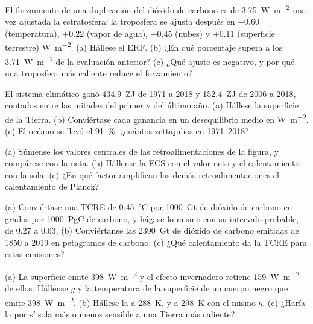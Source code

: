 \begin{exercise}[$\star$]\label{exo:b2:anthropogenic-climate-change:1}
El forzamiento de una duplicación del dióxido de carbono es de \qty{3.75}{W.m^{-2}} una vez ajustada la estratosfera;
la troposfera se ajusta después en $-0.60$ (temperatura), +0.22 (vapor de agua), +0.45 (nubes) y
+0.11 (superficie terrestre) \unit{W.m^{-2}}. (a) Hállese el ERF. (b) ¿En qué porcentaje supera a los
\qty{3.71}{W.m^{-2}} de la evaluación anterior? (c) ¿Qué ajuste es negativo, y por qué una troposfera más caliente
reduce el forzamiento?
\end{exercise}

\begin{exercise}[$\star$]\label{exo:b2:anthropogenic-climate-change:2}
El sistema climático ganó \qty{434.9}{ZJ} de 1971 a 2018 y \qty{152.4}{ZJ} de 2006 a 2018,
contados entre las mitades del primer y del último año. (a) Hállese la superficie de la Tierra.
(b) Conviértase cada ganancia en un desequilibrio medio en \unit{W.m^{-2}}. (c) El océano se llevó el
\qty{91}{\percent}: ¿cuántos zettajulios en 1971--2018?
\end{exercise}

\begin{exercise}[$\star$]\label{exo:b2:anthropogenic-climate-change:3}
(a) Súmense los valores centrales de las retroalimentaciones de la figura, y compárese con la neta. (b) Hállense
la ECS con el valor neto y el calentamiento con la  sola. (c) ¿En qué factor amplifican
las demás retroalimentaciones el calentamiento de Planck?
\end{exercise}

\begin{exercise}[$\star$]\label{exo:b2:anthropogenic-climate-change:4}
(a) Conviértase una TCRE de \qty{0.45}{\celsius} por \qty{1000}{Gt} de dióxido de carbono en grados por
\qty{1000}{PgC} de carbono, y hágase lo mismo con su intervalo probable, de 0.27 a 0.63. (b) Conviértanse las
\qty{2390}{Gt} de dióxido de carbono emitidas de 1850 a 2019 en petagramos de carbono. (c) ¿Qué
calentamiento da la TCRE para estas emisiones?
\end{exercise}

\begin{exercise}[$\star\star$]\label{exo:b2:anthropogenic-climate-change:5}
(a) La superficie emite \qty{398}{W.m^{-2}} y el efecto invernadero retiene \qty{159}{W.m^{-2}} de
ellos. Hállense $g$ y la temperatura de la superficie de un cuerpo negro que emite \qty{398}{W.m^{-2}}. (b) Hállese la
 a \qty{288}{K}, y a \qty{298}{K} con el mismo $g$. (c) ¿Haría la 
por sí sola más o menos sensible a una Tierra más caliente?
\end{exercise}

